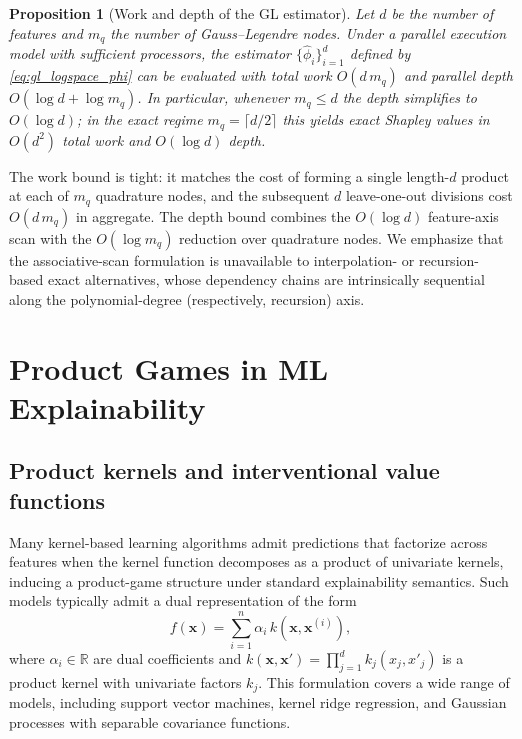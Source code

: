\documentclass{article}
\newtheorem{proposition}{Proposition}
\newcommand{\x}{\mathbf{x}}
\begin{document}
\begin{proposition}[Work and depth of the GL estimator]
\label{prop:complexity}
Let $d$ be the number of features and $m_q$ the number of Gauss--Legendre nodes. Under a parallel execution model with sufficient processors, the estimator $\{\widehat{\phi}_i\}_{i=1}^d$ defined by \cref{eq:gl_logspace_phi} can be evaluated with total work $O(d\,m_q)$ and parallel depth $O(\log d + \log m_q)$. In particular, whenever $m_q \leq d$ the depth simplifies to $O(\log d)$; in the exact regime $m_q = \lceil d/2 \rceil$ this yields exact Shapley values in $O(d^2)$ total work and $O(\log d)$ depth.
\end{proposition}

The work bound is tight: it matches the cost of forming a single length-$d$ product at each of $m_q$ quadrature nodes, and the subsequent $d$ leave-one-out divisions cost $O(d\,m_q)$ in aggregate. The depth bound combines the $O(\log d)$ feature-axis scan with the $O(\log m_q)$ reduction over quadrature nodes. We emphasize that the associative-scan formulation is unavailable to interpolation- or recursion-based exact alternatives, whose dependency chains are intrinsically sequential along the polynomial-degree (respectively, recursion) axis.







\section{Product Games in ML Explainability}
\subsection{Product kernels and interventional value functions}
\label{sec:product_kernels}

Many kernel-based learning algorithms admit predictions that factorize across features when the kernel function decomposes as a product of univariate kernels, inducing a product-game structure under standard explainability semantics. Such models typically admit a dual representation of the form
\begin{equation}
\label{eq:dual_prediction_pk}
f(\x)
=
\sum_{i=1}^n \alpha_i\, k(\x,\x^{(i)}),
\end{equation}
where $\alpha_i \in \mathbb{R}$ are dual coefficients and
$
k(\x,\x')
=
\prod_{j=1}^d k_j(x_j,x'_j)
$
is a product kernel with univariate factors $k_j$.
This formulation covers a wide range of models, including support vector machines, kernel ridge regression,
and Gaussian processes with separable covariance functions.
\end{document}
